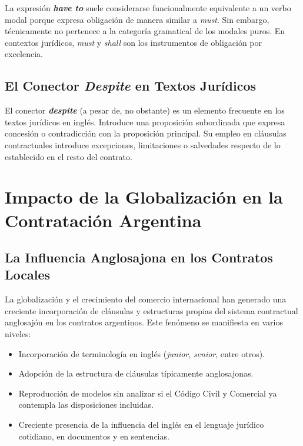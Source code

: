 \documentclass[12pt,oneside]{book}
\begin{document}
\begin{note}
La expresión \textbf{\textit{have to}} suele considerarse funcionalmente
equivalente a un verbo modal porque expresa obligación de manera similar
a \textit{must}. Sin embargo, técnicamente no pertenece a la categoría
gramatical de los modales puros. En contextos jurídicos, \textit{must} y
\textit{shall} son los instrumentos de obligación por excelencia.
\end{note}

\section{El Conector \textit{Despite} en Textos Jurídicos}

El conector \textbf{\textit{despite}} (a pesar de, no obstante) es un
elemento frecuente en los textos jurídicos en inglés. Introduce una
proposición subordinada que expresa concesión o contradicción con la
proposición principal. Su empleo en cláusulas contractuales introduce
excepciones, limitaciones o salvedades respecto de lo establecido en el
resto del contrato.

\chapter{Impacto de la Globalización en la Contratación Argentina}

\section{La Influencia Anglosajona en los Contratos Locales}

La globalización y el crecimiento del comercio internacional han generado
una creciente incorporación de cláusulas y estructuras propias del sistema
contractual anglosajón en los contratos argentinos. Este fenómeno se
manifiesta en varios niveles:

\begin{itemize}
    \item Incorporación de terminología en inglés (\textit{junior},
    \textit{senior}, entre otros).
    \item Adopción de la estructura de cláusulas típicamente anglosajonas.
    \item Reproducción de modelos sin analizar si el Código Civil y Comercial
    ya contempla las disposiciones incluidas.
    \item Creciente presencia de la influencia del inglés en el lenguaje
    jurídico cotidiano, en documentos y en sentencias.
\end{itemize}
\end{document}
